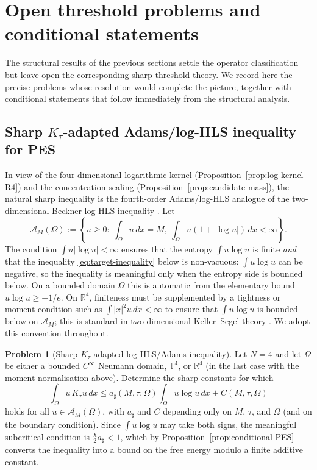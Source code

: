 \documentclass[11pt,reqno]{amsart}
\theoremstyle{definition}
\newtheorem{problem}[theorem]{Problem}
\theoremstyle{remark}
\newcommand{\R}{\mathbb{R}}
\newcommand{\T}{\mathbb{T}}
\newcommand{\Adm}{\mathcal{A}}
\begin{document}
\section{Open threshold problems and conditional statements}
\label{sec:open}

The structural results of the previous sections settle the operator classification but leave open the corresponding sharp threshold theory. We record here the precise problems whose resolution would complete the picture, together with conditional statements that follow immediately from the structural analysis.

\subsection{Sharp $K_\tau$-adapted Adams/log-HLS inequality for PES}
\label{subsec:sharp-log-HLS}

In view of the four-dimensional logarithmic kernel (Proposition~\ref{prop:log-kernel-R4}) and the concentration scaling (Proposition~\ref{prop:candidate-mass}), the natural sharp inequality is the fourth-order Adams/log-HLS analogue of the two-dimensional Beckner log-HLS inequality \cite{beckner1993sharp}. Let
\begin{equation}\label{eq:admissible-class}
        \Adm_M(\Omega):=\left\{u\ge 0:\ \int_\Omega u\,dx=M,\ \int_\Omega u(1+|\log u|)\,dx<\infty\right\}.
\end{equation}
The condition $\int u|\log u|<\infty$ ensures that the entropy $\int u\log u$ is finite \emph{and} that the inequality \eqref{eq:target-inequality} below is non-vacuous: $\int u\log u$ can be negative, so the inequality is meaningful only when the entropy side is bounded below. On a bounded domain $\Omega$ this is automatic from the elementary bound $u\log u\ge -1/e$. On $\R^{4}$, finiteness must be supplemented by a tightness or moment condition such as $\int|x|^{2}u\,dx<\infty$ to ensure that $\int u\log u$ is bounded below on $\Adm_M$; this is standard in two-dimensional Keller--Segel theory \cite{blanchet2006two}. We adopt this convention throughout.

\begin{problem}[Sharp $K_\tau$-adapted log-HLS/Adams inequality]\label{prob:sharp-logHLS}
Let $N=4$ and let $\Omega$ be either a bounded $C^{\infty}$ Neumann domain, $\T^{4}$, or $\R^{4}$ (in the last case with the moment normalisation above). Determine the sharp constants for which
\begin{equation}\label{eq:target-inequality}
        \int_\Omega u\,K_\tau u\,dx\le a_{\sharp}(M,\tau,\Omega)\int_\Omega u\log u\,dx+C(M,\tau,\Omega)
\end{equation}
holds for all $u\in\Adm_M(\Omega)$, with $a_{\sharp}$ and $C$ depending only on $M$, $\tau$, and $\Omega$ (and on the boundary condition). Since $\int u\log u$ may take both signs, the meaningful subcritical condition is $\tfrac{\chi}{2}a_{\sharp}<1$, which by Proposition~\ref{prop:conditional-PES} converts the inequality into a bound on the free energy modulo a finite additive constant.
\end{problem}
\end{document}

